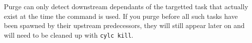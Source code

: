 Purge can only detect downstream dependants of the targetted task that
actually exist at the time the command is used. If you purge before all
such tasks have been spawned by their upstream predecessors, they will
still appear later on and will need to be cleaned up 
with \lstinline=cylc kill=.
